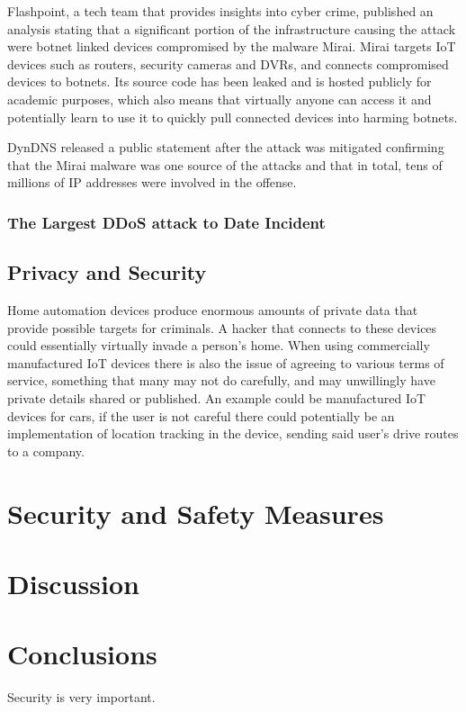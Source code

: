 \documentclass[a4paper, conference]{IEEEtran/IEEEtran}
\begin{document}
Flashpoint, a tech team that provides insights into cyber crime,\cite{flashpoint} published an analysis stating that a significant portion of the infrastructure causing the attack were botnet linked devices compromised by the malware Mirai.\cite{fpmirai} Mirai targets IoT devices such as routers, security cameras and DVRs, and connects compromised devices to botnets. Its source code has been leaked and is hosted publicly for academic purposes, which also means that virtually anyone can access it and potentially learn to use it to quickly pull connected devices into harming botnets.

DynDNS released a public statement after the attack was mitigated confirming that the Mirai malware was one source of the attacks and that in total, tens of millions of IP addresses were involved in the offense.\cite{dynstatement}

\subsubsection{The Largest DDoS attack to Date Incident}

\subsection{Privacy and Security}
Home automation devices produce enormous amounts of private data that provide possible targets for criminals. A hacker that connects to these devices could essentially virtually invade a person's home. When using commercially manufactured IoT devices there is also the issue of agreeing to various terms of service, something that many may not do carefully, and may unwillingly have private details shared or published. An example could be manufactured IoT devices for cars, if the user is not careful there could potentially be an implementation of location tracking in the device, sending said user's drive routes to a company.\cite{meola}

\section{Security and Safety Measures}

\section{Discussion}

\section{Conclusions}
Security is very important.
\end{document}
